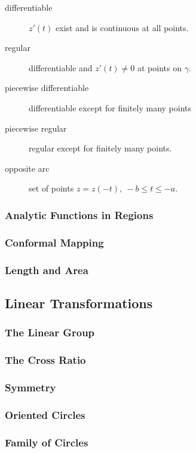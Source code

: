\begin{description}
	\item[differentiable] $z'(t)$ exist and is continuous at all points.
	\item[regular] differentiable and $z'(t) \ne 0$ at points on $\gamma$.
	\item[piecewise differentiable] differentiable except for finitely many points
	\item[piecewise regular] regular except for finitely many points.
	\item[opposite arc] set of points $z = z(-t),\ -b \le t \le -a$.
\end{description}
\subsubsection{Analytic Functions in Regions}
\subsubsection{Conformal Mapping}
\subsubsection{Length and Area}
\subsection{Linear Transformations}
\subsubsection{The Linear Group}
\subsubsection{The Cross Ratio}
\subsubsection{Symmetry}
\subsubsection{Oriented Circles}
\subsubsection{Family of Circles}



